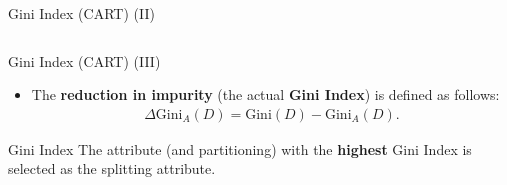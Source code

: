 \begin{frame}{Gini Index (CART) (II)}
{\begin{columns}
{\begin{column}{0.45\textwidth}
				\end{column}
			}
		\end{columns}

		\vspace*{0.25cm}

	}
\end{frame}

\begin{frame}{Gini Index (CART) (III)}
	\begin{itemize}
		\item The \textbf{reduction in impurity} (the actual \textbf{Gini Index}) is defined as
		      follows:
		      \begin{align*}
			      \Delta\text{Gini}_A(D) = \text{Gini}(D)-\text{Gini}_A(D).
		      \end{align*}
	\end{itemize}

	\vspace*{4em}

	\begin{block}{Gini Index}
		The attribute (and partitioning) with the \textbf{highest} Gini Index is selected as the splitting attribute.
	\end{block}

\end{frame}

